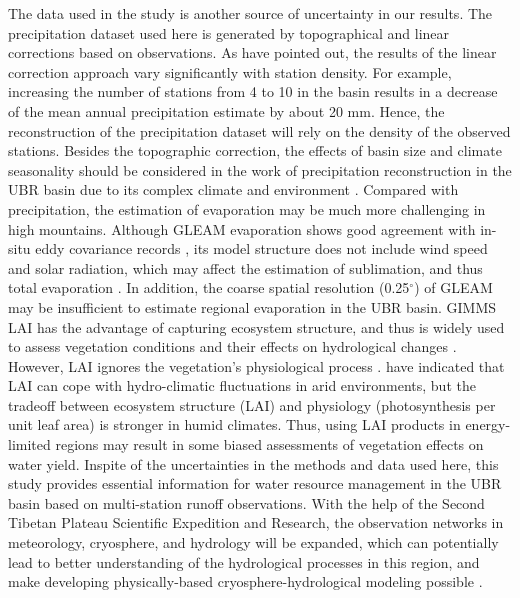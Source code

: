 \documentclass[hess, manuscript]{copernicus}
\begin{document}
The data used in the study is another source of uncertainty in our results. The precipitation dataset used here is generated by topographical and linear corrections based on observations. As \citet{sun2020precipitation} have pointed out, the results of the linear correction approach vary significantly with station density. For example, increasing the number of stations from 4 to 10 in the basin results in a decrease of the mean annual precipitation estimate by about 20 mm. Hence, the reconstruction of the precipitation dataset will rely on the density of the observed stations. Besides the topographic correction, the effects of basin size and climate seasonality should be considered in the work of precipitation reconstruction in the UBR basin due to its complex climate and environment \citep{sun2019contrasting}. Compared with precipitation, the estimation of evaporation may be much more challenging in high mountains. Although GLEAM evaporation shows good agreement with in-situ eddy covariance records \citep{yang2017multi}, its model structure does not include wind speed and solar radiation, which may affect the estimation of sublimation, and thus total evaporation \citep{li2019evapotranspiration}. 
In addition, the coarse spatial resolution (0.25$^{\circ}$) of GLEAM may be insufficient to estimate regional evaporation in the UBR basin.
GIMMS LAI has the advantage of capturing ecosystem structure, and thus is widely used to assess vegetation conditions and their effects on hydrological changes \citep{zhu2016greening,forzieri2020increased,gonsamo2021greening}. However, LAI ignores the vegetation's physiological process \citep{fang2019overview}. \citet{hu2022decoupling} have indicated that LAI can cope with hydro-climatic fluctuations in arid environments, but the tradeoff between ecosystem structure (LAI) and physiology (photosynthesis per unit leaf area) is stronger in humid climates. Thus, using LAI products in energy-limited regions may result in some biased assessments of vegetation effects on water yield.
Inspite of the uncertainties in the methods and data used here, this study provides essential information for water resource management in the UBR basin based on multi-station runoff observations. With the help of the Second Tibetan Plateau Scientific Expedition and Research, the observation networks in meteorology, cryosphere, and hydrology will be expanded, which can potentially lead to better understanding of the hydrological processes in this region, and make developing physically-based cryosphere-hydrological modeling possible \citep{wang2022observing}.
\end{document}
